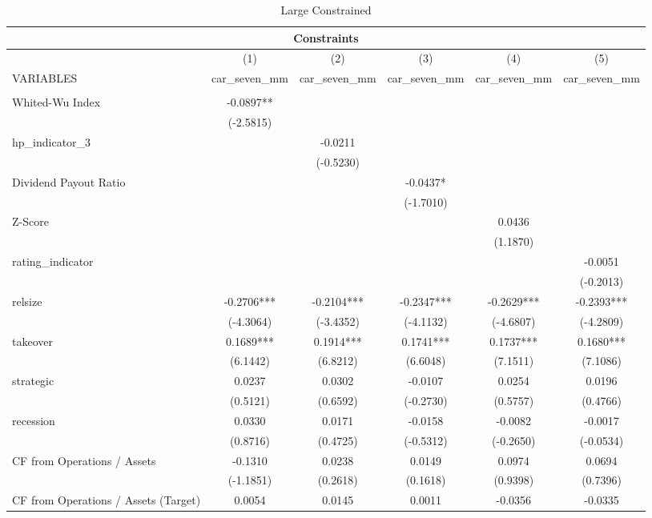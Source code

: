 \documentclass[12pt]{article}
\begin{document}
\begin{table}
	\centering
	\caption{Large Constrained}
	\begin{adjustbox}{max width=\textwidth}
		\begin{tabular}{lccccc}
			\multicolumn{6}{c}{Constraints} \\ \hline
			 & (1) & (2) & (3) & (4) & (5) \\
			VARIABLES & car\_seven\_mm & car\_seven\_mm & car\_seven\_mm & car\_seven\_mm & car\_seven\_mm \\ \hline
			 &  &  &  &  &  \\
			Whited-Wu Index & -0.0897** &  &  &  &  \\
			 & (-2.5815) &  &  &  &  \\
			hp\_indicator\_3 &  & -0.0211 &  &  &  \\
			 &  & (-0.5230) &  &  &  \\
			Dividend Payout Ratio &  &  & -0.0437* &  &  \\
			 &  &  & (-1.7010) &  &  \\
			Z-Score &  &  &  & 0.0436 &  \\
			 &  &  &  & (1.1870) &  \\
			rating\_indicator &  &  &  &  & -0.0051 \\
			 &  &  &  &  & (-0.2013) \\
			relsize & -0.2706*** & -0.2104*** & -0.2347*** & -0.2629*** & -0.2393*** \\
			 & (-4.3064) & (-3.4352) & (-4.1132) & (-4.6807) & (-4.2809) \\
			takeover & 0.1689*** & 0.1914*** & 0.1741*** & 0.1737*** & 0.1680*** \\
			 & (6.1442) & (6.8212) & (6.6048) & (7.1511) & (7.1086) \\
			strategic & 0.0237 & 0.0302 & -0.0107 & 0.0254 & 0.0196 \\
			 & (0.5121) & (0.6592) & (-0.2730) & (0.5757) & (0.4766) \\
			recession & 0.0330 & 0.0171 & -0.0158 & -0.0082 & -0.0017 \\
			 & (0.8716) & (0.4725) & (-0.5312) & (-0.2650) & (-0.0534) \\
			CF from Operations / Assets & -0.1310 & 0.0238 & 0.0149 & 0.0974 & 0.0694 \\
			 & (-1.1851) & (0.2618) & (0.1618) & (0.9398) & (0.7396) \\
			CF from Operations / Assets (Target) & 0.0054 & 0.0145 & 0.0011 & -0.0356 & -0.0335 \\

\end{tabular}
\end{adjustbox}
\end{table}
\end{document}

